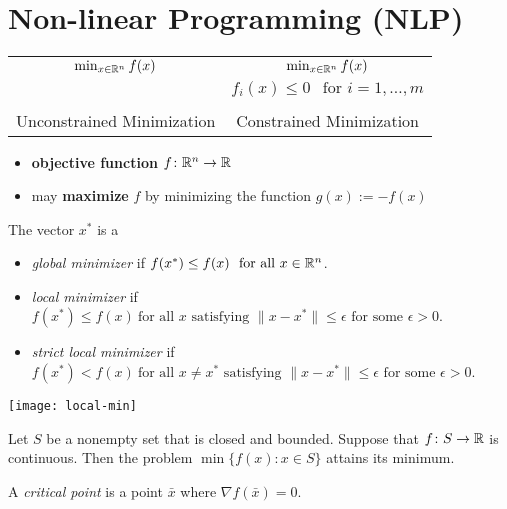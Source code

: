 \documentclass[../open-optimization/open-optimization.tex]{subfiles}
\begin{document}
\chapter{Non-linear Programming (NLP)}
\begin{center}
\begin{tabular}{|c|c|}
\hline
$
\min_{x \in {\mathbb{R}}^n} f(x)
$
& 
$\min_{x \in {\mathbb{R}}^n} f(x)$ \\
&$ f_i(x) \leq 0  \ \ \text{ for } i=1, \dots, m$\\
&\\
Unconstrained Minimization & Constrained Minimization\\
\hline
\end{tabular}
\end{center}

\begin{itemize}
\item \textbf{objective function} $f \colon {\mathbb{R}}^n \to {\mathbb{R}}$
\item may \textbf{maximize} $f$ by minimizing the function $g(x) := -f(x)$
\end{itemize}


\begin{definition}
The vector $x^*$ is a
\begin{itemize}
\item  \emph{global minimizer} if $f(x^*) \leq f(x) \ \text{ for all } x \in {\mathbb{R}}^n$.
\item  \emph{local minimizer} if $f(x^*) \leq f(x) \ \text{for all } x \text{ satisfying } \| x- x^*\| \leq \epsilon \text{ for some } \epsilon > 0$.
\item \emph{strict local minimizer} if $f(x^*) < f(x) \ \text{for all } x \neq x^* \text{ satisfying } \| x- x^*\| \leq \epsilon \text{ for some } \epsilon > 0$.
\end{itemize}
\end{definition}

\begin{center}
\texttt{[image: local-min]}
\end{center}


\begin{theorem}
Let $S$ be a nonempty set that is closed and bounded.  Suppose that $f \colon S \to {\mathbb{R}}$ is continuous.  Then the problem $\min\{ f(x) : x \in S\}$ attains its minimum.
\end{theorem}


\begin{definition}
A \emph{critical point} is a point $\bar x$ where $\nabla f(\bar x) = 0$.
\end{definition}
\end{document}
